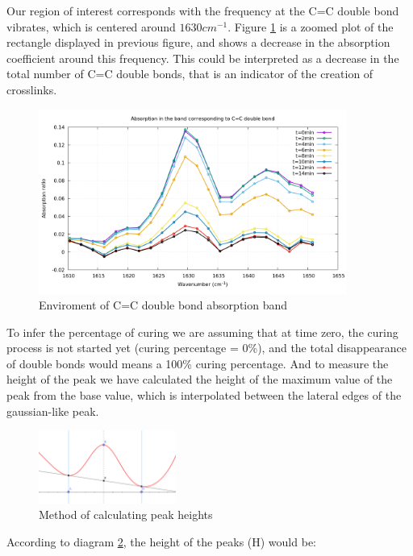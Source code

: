 Our region of interest corresponds with the frequency at the C=C double bond
vibrates, which is centered around $1630cm^{-1}$. Figure \ref{fig:cc_bond} is a zoomed
plot of the rectangle displayed in previous figure, and shows a decrease in the
absorption coefficient around this frequency. This could be interpreted as a
decrease in the total number of C=C double bonds, that is an indicator of the
creation of crosslinks.\\

\begin{figure}[h]
	\centering
	\includegraphics[width=0.9\textwidth]{img/cc_bond_dicrease.png}
	\caption{Enviroment of C=C double bond absorption band}
	\label{fig:cc_bond}
\end{figure}

To infer the percentage of curing we are assuming that at time zero, the curing
process is not started yet (curing percentage = 0\%), and the total disappearance
of double bonds would means a 100\% curing percentage. And to measure the
height of the peak we have calculated the height of the maximum value of the
peak from the base value, which is interpolated between the lateral
edges of the gaussian-like peak.

\begin{figure}[t]
	\centering
	\includegraphics[width=0.4\textwidth]{img/calculation_peak_height.png}
	\caption{Method of calculating peak heights}
	\label{fig:calculation}
\end{figure}

According to diagram \ref{fig:calculation}, the height of the peaks (H) would be:

